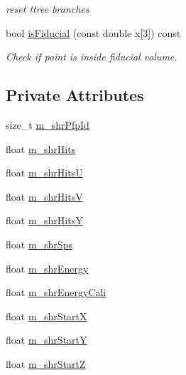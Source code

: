 \begin{DoxyCompactItemize}
\begin{DoxyCompactList}\small\item\em reset ttree branches \end{DoxyCompactList}\item 
bool \hyperlink{classselection_1_1CCincSelection_adf6c627aacf355e0e4c8ff4df5716fee}{is\-Fiducial} (const double x\mbox{[}3\mbox{]}) const 
\begin{DoxyCompactList}\small\item\em Check if point is inside fiducial volume. \end{DoxyCompactList}\end{DoxyCompactItemize}
\subsection*{Private Attributes}
\begin{DoxyCompactItemize}
\item 
size\-\_\-t \hyperlink{classselection_1_1CCincSelection_ad792c1259135d226df875d1150776ce9}{m\-\_\-shr\-Pfp\-Id}
\item 
float \hyperlink{classselection_1_1CCincSelection_a964f3aac8e99293d36792be15e9f2816}{m\-\_\-shr\-Hits}
\item 
float \hyperlink{classselection_1_1CCincSelection_a838d15088def4e962fdd1b664c5960e1}{m\-\_\-shr\-Hits\-U}
\item 
float \hyperlink{classselection_1_1CCincSelection_a35d27e317a7c161b6051fde267d08850}{m\-\_\-shr\-Hits\-V}
\item 
float \hyperlink{classselection_1_1CCincSelection_a5df838908bc1b3428f0c8c50209f4f0d}{m\-\_\-shr\-Hits\-Y}
\item 
float \hyperlink{classselection_1_1CCincSelection_a674a7e5b50475f3afa692bc7a47f5f22}{m\-\_\-shr\-Sps}
\item 
float \hyperlink{classselection_1_1CCincSelection_a2650ff351a7a6589c2b6ff9f701da321}{m\-\_\-shr\-Energy}
\item 
float \hyperlink{classselection_1_1CCincSelection_adec1b19741776f6e33a88b4d0f2b6330}{m\-\_\-shr\-Energy\-Cali}
\item 
float \hyperlink{classselection_1_1CCincSelection_a692099d6cabdf30bfd269f35c3193971}{m\-\_\-shr\-Start\-X}
\item 
float \hyperlink{classselection_1_1CCincSelection_a60b711d11ef5b1ce99992df868e900c7}{m\-\_\-shr\-Start\-Y}
\item 
float \hyperlink{classselection_1_1CCincSelection_ac97b3d4c8f1dff8f692de9fc2c9f585c}{m\-\_\-shr\-Start\-Z}

\end{DoxyCompactItemize}
